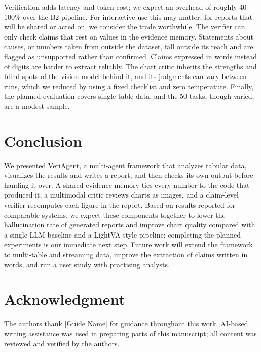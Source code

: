 \documentclass[conference]{IEEEtran}
\begin{document}
Verification adds latency and token cost; we expect an overhead of roughly 40--100\% over the B2 pipeline. For interactive use this may matter; for reports that will be shared or acted on, we consider the trade worthwhile. The verifier can only check claims that rest on values in the evidence memory. Statements about causes, or numbers taken from outside the dataset, fall outside its reach and are flagged as unsupported rather than confirmed. Claims expressed in words instead of digits are harder to extract reliably. The chart critic inherits the strengths and blind spots of the vision model behind it, and its judgments can vary between runs, which we reduced by using a fixed checklist and zero temperature. Finally, the planned evaluation covers single-table data, and the 50 tasks, though varied, are a modest sample.

\section{Conclusion}

We presented VeriAgent, a multi-agent framework that analyzes tabular data, visualizes the results and writes a report, and then checks its own output before handing it over. A shared evidence memory ties every number to the code that produced it, a multimodal critic reviews charts as images, and a claim-level verifier recomputes each figure in the report. Based on results reported for comparable systems, we expect these components together to lower the hallucination rate of generated reports and improve chart quality compared with a single-LLM baseline and a LightVA-style pipeline; completing the planned experiments is our immediate next step. Future work will extend the framework to multi-table and streaming data, improve the extraction of claims written in words, and run a user study with practising analysts.

\section*{Acknowledgment}
The authors thank [Guide Name] for guidance throughout this work. AI-based writing assistance was used in preparing parts of this manuscript; all content was reviewed and verified by the authors.
\end{document}
